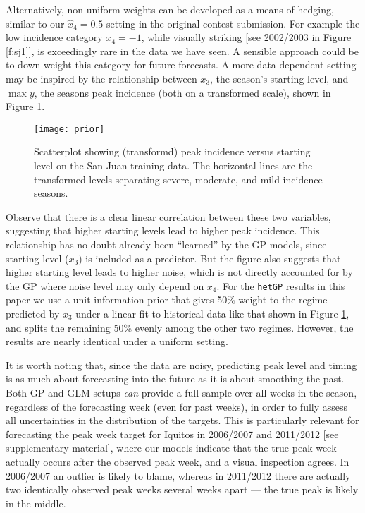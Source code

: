 \documentclass[12pt]{article}
\begin{document}
Alternatively, non-uniform weights can be developed as a means of hedging,
similar to our $\hat{x}_4 = 0.5$ setting in the original contest submission.
For example the low incidence category $x_4 = -1$, while visually striking
[see 2002/2003 in Figure \ref{f:sj1}], is exceedingly rare in the data we have
seen.  A sensible approach could be to down-weight this category for future
forecasts. A more data-dependent setting may be inspired by the relationship
between $x_3$, the season's starting level, and $\max y$, the seasons peak
incidence (both on a transformed scale), shown in Figure \ref{f:prior}.
\begin{figure}[ht!]
\centering
\texttt{[image: prior]}
\caption{Scatterplot showing (transformd) peak incidence versus starting level
on the San Juan training data.  The horizontal lines are the transformed
levels separating severe, moderate, and mild incidence seasons.}
\label{f:prior}
\end{figure}
Observe that there is a clear linear correlation between these two variables,
suggesting that higher starting levels lead to higher peak incidence.  This
relationship has no doubt already been ``learned'' by the GP models, since
starting level ($x_3$) is included as a predictor.  But the figure also
suggests that higher starting level leads to higher noise, which is not
directly accounted for by the GP where noise level may only depend on $x_4$.
For the {\tt hetGP} results in this paper we use a unit information prior that
gives 50\% weight to the regime predicted by $x_3$ under a linear fit to
historical data like that shown in Figure \ref{f:prior}, and splits the
remaining 50\% evenly among the other two regimes.  However, the results are
nearly identical under a uniform setting.

It is worth noting that, since the data are noisy, predicting peak level and
timing is as much about forecasting into the future as it is about smoothing
the past.  Both GP and GLM setups {\em can} provide a full sample over all
weeks in the season, regardless of the forecasting week (even for past weeks),
in order to fully assess all uncertainties in the distribution of the targets.
This is particularly relevant for forecasting the peak week target for Iquitos
in 2006/2007 and 2011/2012 [see supplementary material], where our models
indicate that the true peak week actually occurs after the observed peak week,
and a visual inspection agrees.  In 2006/2007 an outlier is likely to blame,
whereas in 2011/2012 there are actually two identically observed peak weeks
several weeks apart --- the true peak is likely in the middle.
\end{document}
